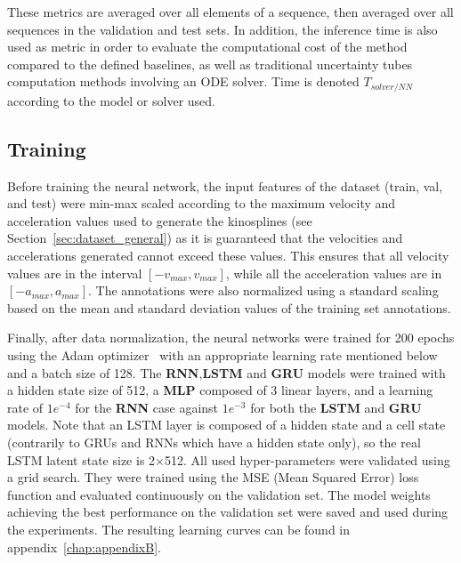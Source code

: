 These metrics are averaged over all elements of a sequence, then averaged over all sequences in the validation and test sets. 
In addition, the inference time is also used as metric in order to evaluate the computational cost of the method compared to the defined baselines, as well as traditional uncertainty tubes computation methods involving an ODE solver. 
Time is denoted $T_{solver/NN}$ according to the model or solver used.

\subsection{Training}

Before training the neural network, the input features of the dataset (train, val, and test) were min-max scaled according to the maximum velocity and acceleration values used to generate the kinosplines (see Section~\ref{sec:dataset_general}) as it is guaranteed that the velocities and accelerations generated cannot exceed these values. 
This ensures that all velocity values are in the interval $[-v_{max}, v_{max}]$, while all the acceleration values are in $[-a_{max}, a_{max}]$. 
The annotations were also normalized using a standard scaling based on the mean and standard deviation values of the training set annotations.

Finally, after data normalization, the neural networks were trained for 200 epochs using the Adam optimizer~\cite{kingma2014adam} with an appropriate learning rate mentioned below and a batch size of 128. 
The \textbf{RNN},\textbf{LSTM} and \textbf{GRU} models were trained with a hidden state size of 512, a \textbf{MLP} composed of 3 linear layers, and a learning rate of $1e^{-4}$ for the \textbf{RNN} case against $1e^{-3}$ for both the \textbf{LSTM} and \textbf{GRU} models.
Note that an LSTM layer is composed of a hidden state and a cell state (contrarily to GRUs and RNNs which have a hidden state only), so the real LSTM latent state size is 2$\times$512.
All used hyper-parameters were validated using a grid search.
They were trained using the MSE (Mean Squared Error) loss function and evaluated continuously on the validation set. 
The model weights achieving the best performance on the validation set were saved and used during the experiments.
The resulting learning curves can be found in appendix~\ref{chap:appendixB}.



